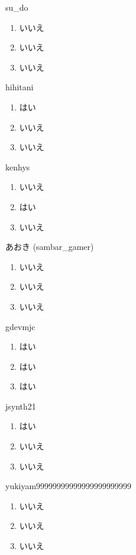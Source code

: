 \begin{prework}{ su\_do }
  \begin{enumerate}
  \item いいえ
  \item いいえ
  \item いいえ
  \end{enumerate}
\end{prework}

\begin{prework}{ hihitani }
  \begin{enumerate}
  \item はい
  \item いいえ
  \item いいえ
  \end{enumerate}
\end{prework}

\begin{prework}{ kenhys }
  \begin{enumerate}
  \item いいえ
  \item はい
  \item いいえ
  \end{enumerate}
\end{prework}

\begin{prework}{ あおき (sambar\_gamer) }
  \begin{enumerate}
  \item いいえ
  \item いいえ
  \item いいえ
  \end{enumerate}
\end{prework}

\begin{prework}{ gdevmjc }
  \begin{enumerate}
  \item はい
  \item はい
  \item はい
  \end{enumerate}
\end{prework}

\begin{prework}{ jsynth21 }
  \begin{enumerate}
  \item はい
  \item いいえ
  \item いいえ
  \end{enumerate}
\end{prework}

\begin{prework}{ yukiyam99999999999999999999999 }
  \begin{enumerate}
  \item いいえ
  \item いいえ
  \item いいえ
  \end{enumerate}
\end{prework}
